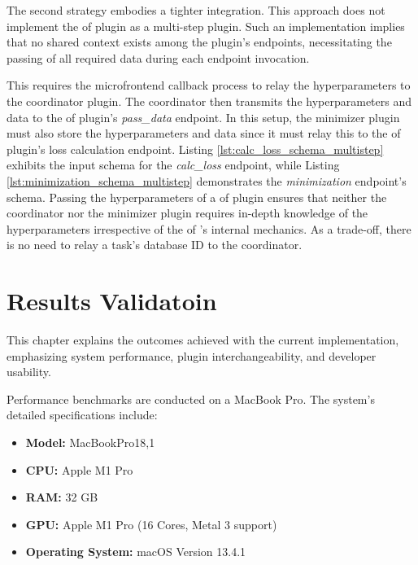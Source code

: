 \documentclass[
  a4paper,  %
  twoside,  %
  bibliography=totoc,
  headsepline,
  cleardoublepage=empty,
  parskip=half,
  draft=false
]{scrbook}
\begin{document}
The second strategy embodies a tighter integration.
This approach does not implement the \gls{of} plugin as a multi-step plugin.
Such an implementation implies that no shared context exists among the plugin's endpoints, necessitating the passing of all required data during each endpoint invocation.

This requires the microfrontend callback process to relay the hyperparameters to the coordinator plugin.
The coordinator then transmits the hyperparameters and data to the \gls{of} plugin's \emph{pass\_data} endpoint.
In this setup, the minimizer plugin must also store the hyperparameters and data since it must relay this to the \gls{of} plugin's loss calculation endpoint.
Listing \ref{lst:calc_loss_schema_multistep} exhibits the input schema for the \emph{calc\_loss} endpoint, while Listing \ref{lst:minimization_schema_multistep} demonstrates the \emph{minimization} endpoint's schema.
Passing the hyperparameters of a \gls{of} plugin ensures that neither the coordinator nor the minimizer plugin requires in-depth knowledge of the hyperparameters irrespective of the \gls{of} 's internal mechanics.
As a trade-off, there is no need to relay a task's database ID to the coordinator.

\noindent\begin{minipage}{\linewidth}
  
\end{minipage}

\noindent\begin{minipage}{\linewidth}
  
\end{minipage}


\chapter{Results Validatoin}
\label{chap:results}

This chapter explains the outcomes achieved with the current implementation, emphasizing system performance, plugin interchangeability, and developer usability.

Performance benchmarks are conducted on a MacBook Pro. The system's detailed specifications include:

\begin{itemize}
    \item \textbf{Model:} MacBookPro18,1
    \item \textbf{CPU:} Apple M1 Pro
    \item \textbf{RAM:} 32 GB
    \item \textbf{GPU:} Apple M1 Pro (16 Cores, Metal 3 support)
    \item \textbf{Operating System:} macOS Version 13.4.1
\end{itemize}
\end{document}
